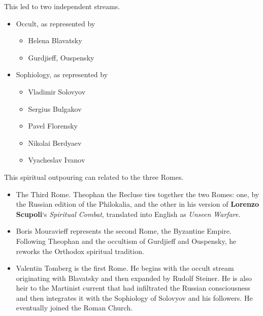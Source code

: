 This led to two independent streams.

\begin{itemize}


\item Occult, as represented by

  \begin{itemize}

  
\item Helena Blavatsky
  
\item Gurdjieff, Ouspensky
  \end{itemize}


\item Sophiology, as represented by

  \begin{itemize}

  
\item Vladimir Solovyov
  
\item Sergius Bulgakov
  
\item Pavel Florensky
  
\item Nikolai Berdyaev
  
\item Vyacheslav Ivanov
  \end{itemize}

\end{itemize}


This spiritual outpouring can related to the three Romes.

\begin{itemize}


\item The Third Rome. Theophan the Recluse ties together the two Romes: one, by the Russian edition of the Philokalia, and the other in his version of \textbf{Lorenzo Scupoli}`s \emph{Spiritual Combat}, translated into English as \emph{Unseen Warfare}.

\item Boris Mouravieff represents the second Rome, the Byzantine Empire. Following Theophan and the occultism of Gurdjieff and Ouspensky, he reworks the Orthodox spiritual tradition.

\item Valentin Tomberg is the first Rome. He begins with the occult stream originating with Blavatsky and then expanded by Rudolf Steiner. He is also heir to the Martinist current that had infiltrated the Russian consciousness and then integrates it with the Sophiology of Solovyov and his followers. He eventually joined the Roman Church.
\end{itemize}


